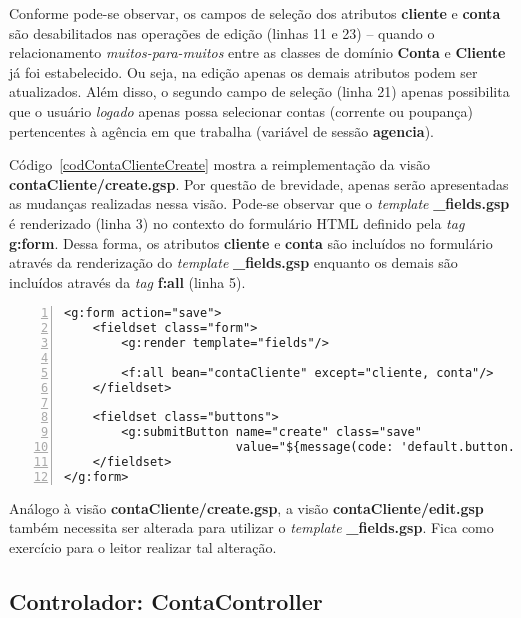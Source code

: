 Conforme pode-se  observar, os campos de  seleção dos atributos  {\bf cliente} e
{\bf conta} são desabilitados nas operações de edição (linhas 11 e 23) -- quando
o  relacionamento {\em  muitos-para-muitos}  entre as  classes  de domínio  {\bf
  Conta} e  {\bf Cliente}  já foi  estabelecido.  Ou seja,  na edição  apenas os
demais atributos podem  ser atualizados. Além disso, o  segundo campo de seleção
(linha 21) apenas possibilita que o usuário {\it logado} apenas possa selecionar
contas (corrente ou  poupança) pertencentes à agência em  que trabalha (variável
de sessão {\bf agencia}).  

\vspace{0.2cm}

Código~\ref{codContaClienteCreate}  mostra  a   reimplementação  da  visão  {\bf
  contaCliente/create.gsp}. Por questão  de brevidade, apenas serão apresentadas
as mudanças realizadas nessa visão.   Pode-se observar que o {\it template} {\bf
  \_fields.gsp} é renderizado (linha 3)  no contexto do formulário HTML definido
pela {\it  tag} {\bf g:form}.   Dessa forma, os  atributos {\bf cliente}  e {\bf
  conta} são incluídos  no formulário através da renderização  do {\it template}
{\bf \_fields.gsp}  enquanto os demais são  incluídos através da  {\it tag} {\bf
  f:all} (linha 5).  

\begin{lstlisting}[caption={\bf    contaCliente/create.gsp},
    frame=trBL, float=htbp, label=codContaClienteCreate, numbers=left]
<g:form action="save">
    <fieldset class="form">
        <g:render template="fields"/>

        <f:all bean="contaCliente" except="cliente, conta"/>
    </fieldset>

    <fieldset class="buttons">
        <g:submitButton name="create" class="save"
                        value="${message(code: 'default.button.create.label', default: 'Create')}"/>
    </fieldset>
</g:form>
\end{lstlisting}

\begin{remark}
Análogo    à    visão    {\bf    contaCliente/create.gsp},    a    visão    {\bf
  contaCliente/edit.gsp}  também necessita  ser  alterada para  utilizar o  {\it
  template} {\bf \_fields.gsp}.  Fica como exercício para o  leitor realizar tal
alteração. 
\end{remark}

\subsection{Controlador: ContaController}

